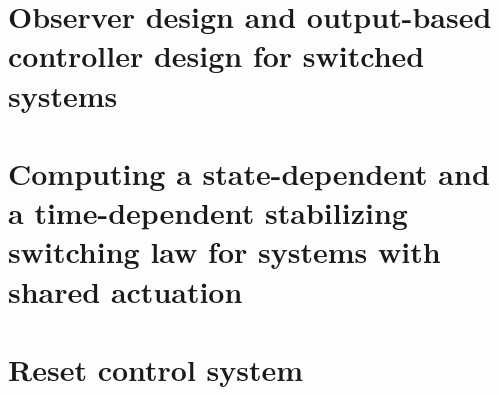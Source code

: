\documentclass[a4paper,1cm]{article}
\numberwithin{equation}{section}
\numberwithin{figure}{section}
\numberwithin{table}{section}
\begin{document}
\section{Observer design and output-based controller design for switched systems}
 \cleardoublepage
\section{Computing a state-dependent and a time-dependent stabilizing switching
law for systems with shared actuation}
 \cleardoublepage
\section{Reset control system}




\begin{appendices}

\end{appendices}

\clearpage



\end{document}
